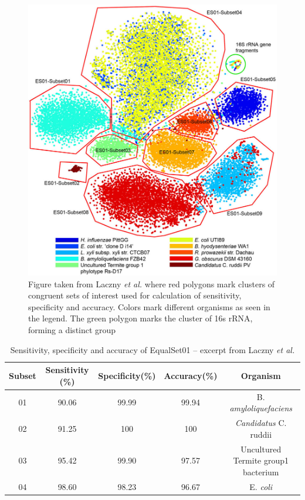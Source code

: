 \documentclass[twocolumn]{bmcart}%
\begin{document}
\begin{figure}[h!]
	\centering
	\includegraphics[width=.98\linewidth]{bilder/clusterData1.jpg}
	\caption{Figure taken from Laczny \textit{et al.} \cite{Laczny2014} where red polygons mark clusters of congruent sets of interest used for calculation of sensitivity, specificity and accuracy. Colors mark different organisms as seen in the legend. The green polygon marks the cluster of 16s rRNA, forming a distinct group}
	\label{img:clusterData1}
\end{figure}%
\begin{table}[h]
	\centering
	\caption{Sensitivity, specificity and accuracy of EqualSet01 -- excerpt from Laczny \textit{et al.}\cite{Laczny2014}}
	\begin{tabular}{c|c|c|c|c}
		Subset&Sensitivity (\%)&Specificity(\%)&Accuracy(\%)&Organism\\
		\hline
		01&90.06&99.99&99.94&B. \textit{amyloliquefaciens}\\
		02&91.25&100&100&\textit{Candidatus} C. ruddii\\
		03&95.42&99.90&97.57&Uncultured Termite group1 bacterium\\
		04&98.60&98.23&96.67&E. \textit{coli}
	\end{tabular}
\label{tab:sens-spec-acc1}
\end{table}%
\end{document}
